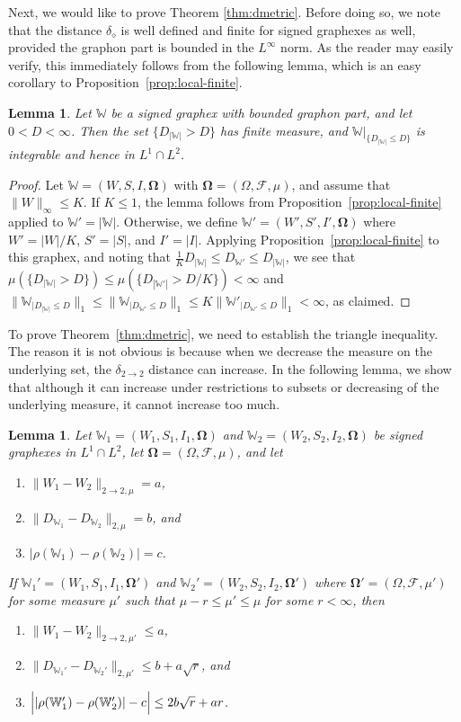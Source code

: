 \documentclass{amsart}
\numberwithin{equation}{section}
\numberwithin{figure}{section}
\newtheorem{lemma}[theorem]{Lemma}
\theoremstyle{definition}
\theoremstyle{remark}
\newcommand{\bOmega}{{\mathbf{\Omega}}}
\newcommand{\cW}{\mathbb{W}}
\newcommand{\cF}{\mathcal{F}}
\newcommand{\deltt}{\delta_{2\to 2}}
\def\delGP{\delta_\diamond}
\begin{document}
Next, we would like to prove Theorem \ref{thm:dmetric}. Before doing so, we
note that the distance $\delGP$ is well defined and finite for signed
graphexes as well, provided the graphon part is bounded in the $L^\infty$
norm. As the reader may easily verify, this immediately follows from the
following lemma, which is an easy corollary to
Proposition~\ref{prop:local-finite}.

\begin{lemma}
\label{lem:signed-delGP<infty} Let $\cW$ be a signed graphex with bounded
graphon part, and let $0<D<\infty$. Then the set $\{D_{|\cW|}>D\}$ has finite
measure, and $\cW|_{\{D_{|\cW|}\leq D\}}$ is integrable and hence in $L^1\cap
L^2$.
\end{lemma}

\begin{proof}
Let $\cW=(W,S,I,\bOmega)$ with $\bOmega=(\Omega,\cF,\mu)$, and assume that
$\|W\|_\infty\leq K$. If $K\leq 1$, the lemma follows from
Proposition~\ref{prop:local-finite} applied to $\cW'=|\cW|$. Otherwise, we
define $\cW'=(W',S',I',\bOmega)$ where $W'=|W|/K$, $S'=|S|$, and $I'=|I|$.
Applying Proposition~\ref{prop:local-finite} to this graphex, and noting that
$\frac 1K D_{|\cW|}\leq D_{\cW'}\leq D_{|\cW|}$, we see that
$\mu(\{D_{|\cW|}>D\})\leq \mu(\{D_{|\cW'|}>D/K\})<\infty$ and
$\|\cW_{|D_{|\cW|}\leq D}\|_1\leq \|\cW_{|D_{\cW'}\leq D}\|_1\leq
K\|\cW'_{|D_{\cW'}\leq D}\|_1<\infty$, as claimed.
\end{proof}

To prove Theorem~\ref{thm:dmetric}, we need to establish the triangle
inequality. The reason it is not obvious is because when we decrease the
measure on the underlying set, the $\deltt$ distance can increase. In the
following lemma, we show that although it can increase under restrictions to
subsets or decreasing of the underlying measure, it cannot increase too much.

\begin{lemma} \label{lemmaremovedsetdistancenotworse}
Let $\cW_1=(W_1,S_1,I_1,\bOmega)$ and $\cW_2=(W_2,S_2,I_2,\bOmega)$ be signed
graphexes in $L^1\cap L^2$, let $\bOmega=(\Omega,\cF,\mu)$, and let
\begin{enumerate}
\item $\|W_1-W_2\|_{2 \rightarrow 2,\mu} =a$,
\item $\|D_{\cW_1}-D_{\cW_2}\|_{2,\mu} =b$, and
\item $|\rho(\cW_1)-\rho(\cW_2)| =c$.
\end{enumerate}
If $\cW_1'=(W_1,S_1,I_1,\bOmega')$ and $\cW_2'=(W_2,S_2,I_2,\bOmega')$ where
$\bOmega'=(\Omega,\cF,\mu')$ for some measure $\mu'$ such that $\mu-r \le
\mu' \le \mu$ for some $r<\infty$, then
\begin{enumerate}
\item $\|W_1-W_2\|_{2 \rightarrow 2,\mu'} \le a$, \label{removed2to2}
\item $\|D_{\cW_1'}-D_{\cW_2'}\|_{2,\mu'} \le b+a\sqrt{r}$, and
    \label{removedD2}
\item $\Bigl| |\rho(\cW_1')-\rho(\cW_2')| - c\Bigr|\le 2b\sqrt{r}+a r$.
    \label{removedL1}
\end{enumerate}
\end{lemma}
\end{document}
